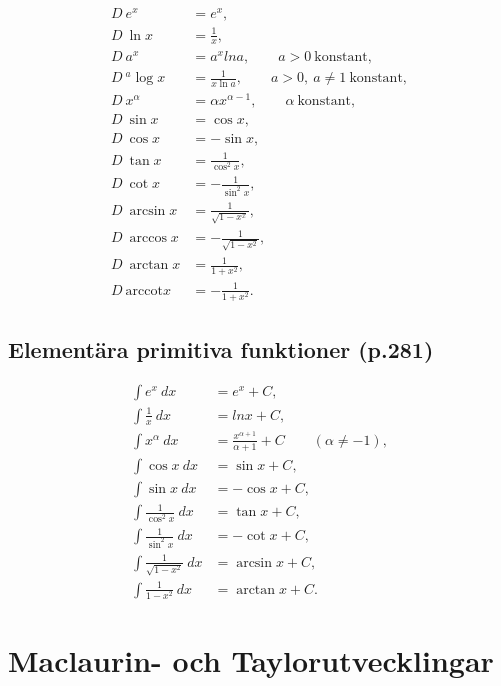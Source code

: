 \documentclass[11pt]{article}
\begin{document}
\begin{align}
    D\ e^x &= e^x,\\
    D\ \ln x &= \frac{1}{x},\\
    D\ a^x &= a^x ln a, \qquad a > 0\ \mathrm{konstant},\\
    D\ {}^{a}\log x &= \frac{1}{x \ln a}, \qquad a > 0,\ a \neq 1\ \mathrm{konstant},\\
    D\ x^\alpha &= \alpha x^{\alpha - 1}, \qquad \alpha\ \mathrm{konstant},\\
    D\ \sin x &= \cos x,\\
    D\ \cos x &= -\sin x,\\
    D\ \tan x &= \frac{1}{\cos^2 x},\\
    D\ \cot x &= -\frac{1}{\sin^2 x},\\
    D\ \arcsin x &= \frac{1}{\sqrt{1 - x^x}},\\
    D\ \arccos x &= -\frac{1}{\sqrt{1 - x^2}},\\
    D\ \arctan x &= \frac{1}{1 + x^2},\\
    D\ \mathrm{arccot} x &= -\frac{1}{1 + x^2}.
\end{align}

\subsection{Elementära primitiva funktioner (p.281)}

\begin{align}
    \int e^{x}\ dx &= e^x + C,\\
    \int \frac{1}{x}\ dx &= ln x + C,\\
    \int x^{\alpha}\ dx &= \frac{x^{\alpha + 1}}{\alpha + 1} + C \qquad (\alpha \neq -1),\\
    \int \cos x\ dx &= \sin x + C,\\
    \int \sin x\ dx &= -\cos x + C,\\
    \int \frac{1}{\cos^2 x}\ dx &= \tan x + C,\\
    \int \frac{1}{\sin^2 x}\ dx &= -\cot x + C,\\
    \int \frac{1}{\sqrt{1 - x^2}}\ dx &= \arcsin x + C,\\
    \int \frac{1}{1 - x^2}\ dx &= \arctan x + C.
\end{align}

\newpage
\section{Maclaurin- och Taylorutvecklingar}
\end{document}
